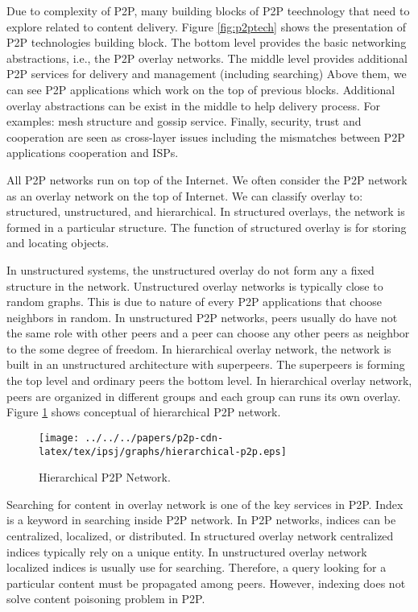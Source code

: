 Due to complexity of P2P, many building blocks of P2P teechnology that need to explore related to content delivery. 
Figure \ref{fig:p2ptech} shows the presentation of P2P technologies building block.
The bottom level provides the basic networking abstractions, i.e., the P2P overlay networks. 
The middle level provides additional P2P services for delivery and management (including searching)
Above them, we can see P2P applications which work on the top of previous blocks.
Additional overlay abstractions can be exist in the middle to help delivery process. 
For examples:  mesh structure and gossip service.
Finally, security, trust and cooperation are seen as cross-layer issues including the mismatches between P2P applications cooperation and ISPs.

All P2P networks run on top of the Internet. 
We often consider the P2P network as an overlay network on the top of Internet. 
We can classify overlay to: structured, unstructured, and hierarchical. 
In structured overlays, the network is formed in a particular structure. 
The function of structured overlay is for storing and locating objects. 

In unstructured systems, the unstructured overlay do not form any a fixed structure in the network. 
Unstructured overlay networks is typically close to random graphs. 
This is due to nature of every P2P applications that choose neighbors in random.
In unstructured P2P networks, peers usually do have not the same role with other peers and a peer can choose any other peers as neighbor to the some degree of freedom.  
In hierarchical overlay network, the network is built in an unstructured architecture with superpeers.
The superpeers is forming the top level and ordinary peers the bottom level.
In hierarchical overlay network, peers are organized in different groups and each group can runs its own overlay. 
Figure \ref{fig:hierarchicalp2p} shows conceptual of hierarchical P2P network. 

\begin{figure}[tb]
\begin{center}
\texttt{[image: ../../../papers/p2p-cdn-latex/tex/ipsj/graphs/hierarchical-p2p.eps]}
\end{center}
\caption{Hierarchical P2P Network.} 
\label{fig:hierarchicalp2p}
\end{figure}



Searching for content in overlay network is one of the key services in P2P.
Index is a keyword in searching inside P2P network.
In P2P networks, indices can be centralized, localized, or distributed. 
In structured overlay network centralized indices typically rely on a unique entity.
In unstructured overlay network localized indices is usually use for searching. 
Therefore, a query looking for a particular content must be propagated among peers.
However, indexing does not solve content poisoning problem in P2P.

